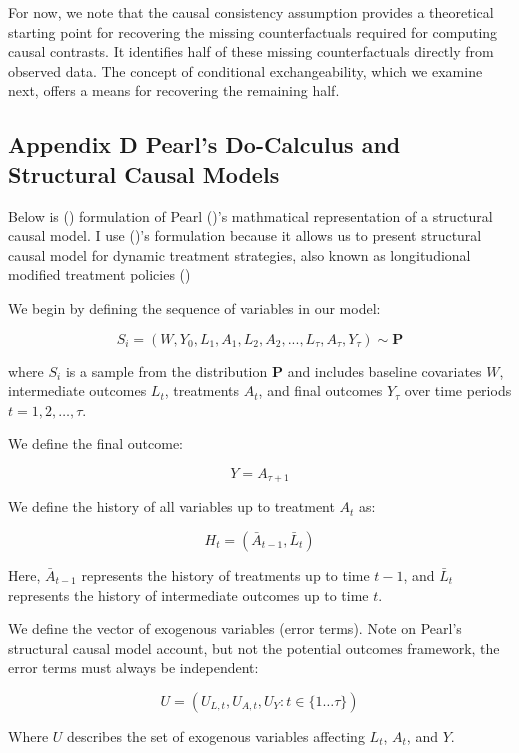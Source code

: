 \documentclass[
  single column]{article}
\begin{document}
For now, we note that the causal consistency assumption provides a
theoretical starting point for recovering the missing counterfactuals
required for computing causal contrasts. It identifies half of these
missing counterfactuals directly from observed data. The concept of
conditional exchangeability, which we examine next, offers a means for
recovering the remaining half.

\newpage{}

\subsection{Appendix D Pearl's Do-Calculus and Structural Causal
Models}\label{id-app-d}

Below is () formulation of Pearl
()'s mathmatical representation of a
structural causal model. I use ()'s
formulation because it allows us to present structural causal model for
dynamic treatment strategies, also known as longitudional modified
treatment policies ()

We begin by defining the sequence of variables in our model:

\[
S_i= (W, Y_0, L_1, A_1, L_2, A_2, ..., L_\tau, A_\tau, Y_{\tau}) \sim \mathbf{P}
\]

where \(S_i\) is a sample from the distribution \(\mathbf{P}\) and
includes baseline covariates \(W\), intermediate outcomes \(L_t\),
treatments \(A_t\), and final outcomes \(Y_{\tau}\) over time periods
\(t = 1, 2, \ldots, \tau\).

We define the final outcome:

\[
Y = A_{\tau + 1}
\]

We define the history of all variables up to treatment \(A_t\) as:

\[
H_t = (\bar{A}_{t-1}, \bar{L}_t)
\]

Here, \(\bar{A}_{t-1}\) represents the history of treatments up to time
\(t-1\), and \(\bar{L}_t\) represents the history of intermediate
outcomes up to time \(t\).

We define the vector of exogenous variables (error terms). Note on
Pearl's structural causal model account, but not the potential outcomes
framework, the error terms must always be independent:

\[
U = (U_{L,t}, U_{A,t}, U_{Y}: t \in \{1 \dots \tau\})
\]

Where \(U\) describes the set of exogenous variables affecting \(L_t\),
\(A_t\), and \(Y\).
\end{document}
